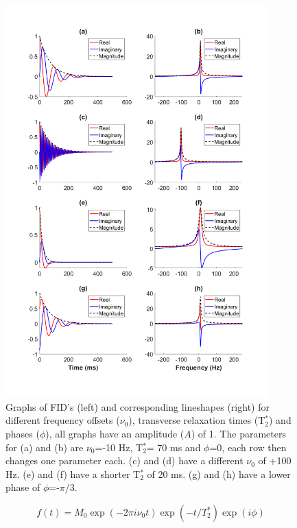 \documentclass[class=article, crop=false]{standalone}
\begin{document}
\begin{figure}
    \centering
    \includegraphics[width=0.9\textwidth]{Figures/Theory/FID_Lorentz.png}
    \caption{Graphs of FID's (left) and corresponding lineshapes (right) for different frequency offsets ($\nu_0$), transverse relaxation times (T$_2^*$) and phases ($\phi$), all graphs have an amplitude ($A$) of 1. The parameters for (a) and (b) are $\nu_0$=-10 Hz, T$_2^*$= 70 ms and $\phi$=0, each row then changes one parameter each. (c) and (d) have a different $\nu_0$ of +100 Hz. (e) and (f) have a shorter T$_2^*$ of 20 ms. (g) and (h) have a lower phase of $\phi$=-$\pi$/3.}
    \label{fig:theory:FID_Lorentz}
\end{figure}

\begin{equation}
    f(t) = M_0\exp(-2\pi i \nu_0t)\exp(-t/T_2^*)\exp(i\phi)
    \label{eqn:theory:euler}
\end{equation}
\end{document}

